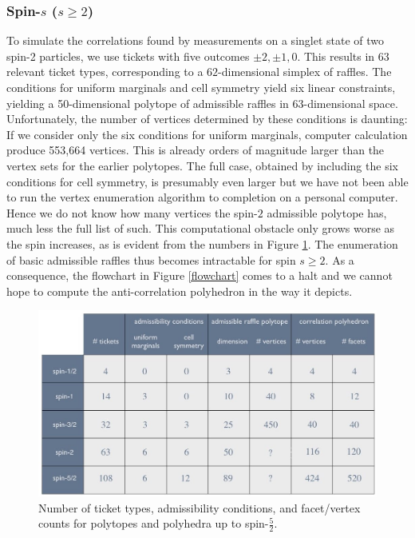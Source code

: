 
\subsubsection{Spin-$s$ ($s \ge 2$)}  \label{2.2.4}

To simulate the correlations found by measurements on a singlet state of two spin-2 particles, we use  tickets with five outcomes $\pm 2,\pm 1,0$. This results in 63 relevant ticket types, corresponding to a $62$-dimensional simplex of raffles. The conditions for uniform marginals and cell symmetry yield six linear constraints, yielding a 50-dimensional polytope of admissible raffles in 63-dimensional space. Unfortunately, the number of vertices determined by these conditions is daunting: If we consider only the six conditions for uniform marginals, computer calculation produce 553,664 vertices. This is already orders of magnitude larger than the vertex sets for the earlier polytopes. The full case, obtained by including the six conditions for cell symmetry, is presumably even larger but we have not been able to run the vertex enumeration algorithm to completion on a personal computer. Hence we do not know how many vertices the spin-$2$ admissible polytope has, much less the full list of such. This computational obstacle only grows worse as the spin increases, as is evident from the numbers in Figure \ref{numberoftickets}. The enumeration of basic admissible raffles thus becomes intractable for spin $s\geq 2$. As a consequence, the flowchart in Figure \ref{flowchart} comes to a halt and we cannot hope to compute the anti-correlation polyhedron in the way it depicts.

\begin{figure}[ht]
 \centering
   \includegraphics[width=4.5in]{numberoftickets.jpeg} 
   \caption{Number of ticket types, admissibility conditions, and facet/vertex counts for polytopes and polyhedra up to spin-$\frac52$.}
      \label{numberoftickets}
\end{figure}

